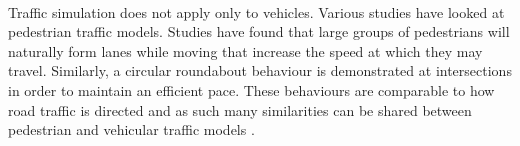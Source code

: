 \paragraph{}
Traffic simulation does not apply only to vehicles. Various studies have looked at pedestrian traffic models. Studies have found that large groups of pedestrians will naturally form lanes while moving that increase the speed at which they may travel. Similarly, a circular roundabout behaviour is demonstrated at intersections in order to maintain an efficient pace. These behaviours are comparable to how road traffic is directed and as such many similarities can be shared between pedestrian and vehicular traffic models \cite{helbing2001self,lovaas1994modeling,helbing2001traffic}.

